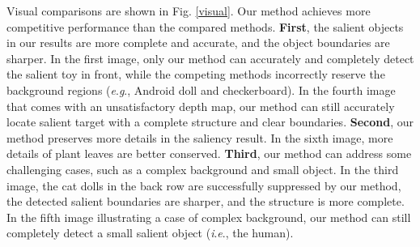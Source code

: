 \documentclass[runningheads]{llncs}
\newcommand{\ie}{\textit{i}.\textit{e}.}
\newcommand{\eg}{\textit{e}.\textit{g}.}
\begin{document}
Visual comparisons are shown in Fig. \ref{visual}. Our method achieves more competitive performance than the compared methods.
\textbf{First}, the salient objects in our results are more complete and accurate, and the object boundaries are sharper. In the first image, only our method can accurately and completely detect the salient toy in front, while the competing methods incorrectly reserve the background regions (\eg, Android doll and checkerboard). In the fourth image that comes with an unsatisfactory depth map, our method can still accurately locate salient target with a complete structure and clear boundaries.
\textbf{Second}, our method preserves more details in the saliency result. In the sixth image, more details of plant leaves are better conserved.
\textbf{Third}, our method can address some challenging cases, such as a complex background and small object. In the third image, the cat dolls in the back row are successfully suppressed by our method, the detected salient boundaries are sharper, and the structure is more complete. In the fifth image illustrating a case of complex background, our method can still completely detect a small salient object (\ie, the human).
\end{document}

